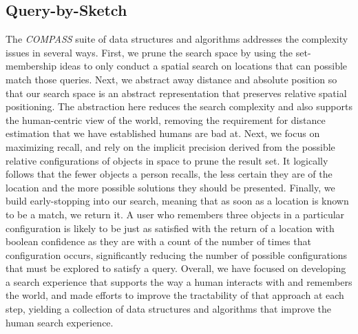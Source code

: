 \subsection{Query-by-Sketch}
\par{

The \textit{COMPASS} suite of data structures and algorithms addresses the complexity issues in several ways. First, we prune the search space by using the set-membership ideas to only conduct a spatial search on locations that can possible match those queries. 
Next, we abstract away distance and absolute position so that our search space is an abstract representation that preserves relative spatial positioning. 
The abstraction here reduces the search complexity and also supports the human-centric view of the world, removing the requirement for distance estimation that we have established humans are bad at. 
Next, we focus on maximizing recall, and rely on the implicit precision derived from the possible relative configurations of objects in space to prune the result set. 
It logically follows that the fewer objects a person recalls, the less certain they are of the location and the more possible solutions they should be presented. 
Finally, we build early-stopping into our search, meaning that as soon as a location is known to be a match, we return it.
A user who remembers three objects in a particular configuration is likely to be just as satisfied with the return of a location with boolean confidence as they are with a count of the number of times that configuration occurs, significantly reducing the number of possible configurations that must be explored to satisfy a query.
Overall, we have focused on developing a search experience that supports the way a human interacts with and remembers the world, and made efforts to improve the tractability of that approach at each step, yielding a collection of data structures and algorithms that improve the human search experience.}

